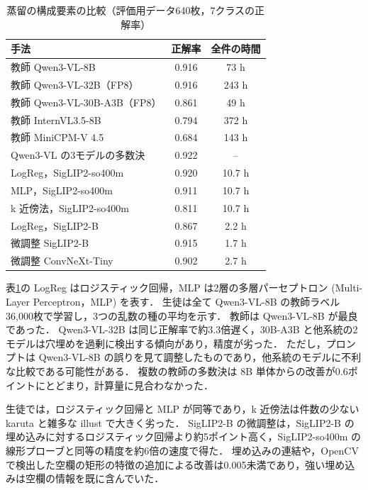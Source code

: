 \begin{table}[t]
    \centering
    \caption{蒸留の構成要素の比較（評価用データ640枚，7クラスの正解率）}
    \label{tab_distill_components}
    \small
    \begin{tabular}{lcc}
        \toprule
        手法 & 正解率 & 全件の時間 \\
        \midrule
        教師 Qwen3-VL-8B & 0.916 & 73 h \\
        教師 Qwen3-VL-32B（FP8） & 0.916 & 243 h \\
        教師 Qwen3-VL-30B-A3B（FP8） & 0.861 & 49 h \\
        教師 InternVL3.5-8B & 0.794 & 372 h \\
        教師 MiniCPM-V 4.5 & 0.684 & 143 h \\
        Qwen3-VL の3モデルの多数決 & 0.922 & -- \\
        \midrule
        LogReg，SigLIP2-so400m & 0.920 & 10.7 h \\
        MLP，SigLIP2-so400m & 0.911 & 10.7 h \\
        k 近傍法，SigLIP2-so400m & 0.811 & 10.7 h \\
        LogReg，SigLIP2-B & 0.867 & 2.2 h \\
        微調整 SigLIP2-B & 0.915 & 1.7 h \\
        微調整 ConvNeXt-Tiny & 0.902 & 2.7 h \\
        \bottomrule
    \end{tabular}
\end{table}

表\ref{tab_distill_components}の LogReg はロジスティック回帰，MLP は2層の多層パーセプトロン (Multi-Layer Perceptron，MLP) を表す．
生徒は全て Qwen3-VL-8B の教師ラベル36,000枚で学習し，3つの乱数の種の平均を示す．
教師は Qwen3-VL-8B が最良であった．
Qwen3-VL-32B は同じ正解率で約3.3倍遅く，30B-A3B と他系統の2モデルは穴埋めを過剰に検出する傾向があり，精度が劣った．
ただし，プロンプトは Qwen3-VL-8B の誤りを見て調整したものであり，他系統のモデルに不利な比較である可能性がある．
複数の教師の多数決は 8B 単体からの改善が0.6ポイントにとどまり，計算量に見合わなかった．

生徒では，ロジスティック回帰と MLP が同等であり，k 近傍法は件数の少ない karuta と雑多な illust で大きく劣った．
SigLIP2-B の微調整は，SigLIP2-B の埋め込みに対するロジスティック回帰より約5ポイント高く，SigLIP2-so400m の線形プローブと同等の精度を約6倍の速度で得た．
埋め込みの連結や，OpenCV で検出した空欄の矩形の特徴の追加による改善は0.005未満であり，強い埋め込みは空欄の情報を既に含んでいた．

